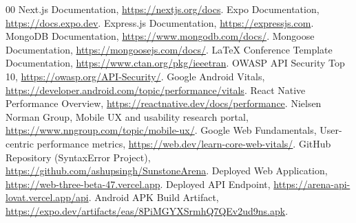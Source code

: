 \documentclass[conference]{IEEEtran}
\begin{document}
\FloatBarrier

\begin{thebibliography}{00}
\small
\sloppy
{} Next.js Documentation, \url{https://nextjs.org/docs}.
 Expo Documentation, \url{https://docs.expo.dev}.
 Express.js Documentation, \url{https://expressjs.com}.
 MongoDB Documentation, \url{https://www.mongodb.com/docs/}.
 Mongoose Documentation, \url{https://mongoosejs.com/docs/}.
 LaTeX Conference Template Documentation, \url{https://www.ctan.org/pkg/ieeetran}.
 OWASP API Security Top 10, \url{https://owasp.org/API-Security/}.
 Google Android Vitals, \url{https://developer.android.com/topic/performance/vitals}.
 React Native Performance Overview, \url{https://reactnative.dev/docs/performance}.
 Nielsen Norman Group, Mobile UX and usability research portal, \url{https://www.nngroup.com/topic/mobile-ux/}.
 Google Web Fundamentals, User-centric performance metrics, \url{https://web.dev/learn-core-web-vitals/}.
 GitHub Repository (SyntaxError Project), \url{https://github.com/ashupsingh/SunstoneArena}.
 Deployed Web Application, \url{https://web-three-beta-47.vercel.app}.
 Deployed API Endpoint, \url{https://arena-api-lovat.vercel.app/api}.
 Android APK Build Artifact, \url{https://expo.dev/artifacts/eas/8PiMGYXSrmhQ7QEv2ud9ns.apk}.
\end{thebibliography}
\end{document}
